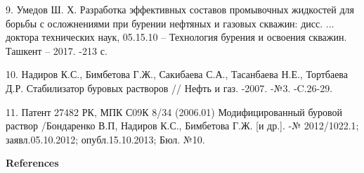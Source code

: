 \begin{references}
9. Умедов Ш. Х. Разработка эффективных составов промывочных жидкостей
для борьбы с осложнениями при бурении нефтяных и газовых скважин: дисс.
... доктора технических наук, 05.15.10 -- Технология бурения и освоения
скважин. Ташкент -- 2017. -213 с.

10. Надиров К.С., Бимбетова Г.Ж., Сакибаева С.А., Тасанбаева Н.Е.,
Тортбаева Д.Р. Стабилизатор буровых растворов // Нефть и газ. -2007.
-№3. -C.26-29.

11. Патент 27482 РК, МПК С09К 8/34 (2006.01) Модифицированный буровой
раствор /Бондаренко В.П, Надиров К.С., Бимбетова Г.Ж. {[}и др.{]}. -№
2012/1022.1; заявл.05.10.2012; опубл.15.10.2013; Бюл. №10.
\end{references}

\begin{center}
{\bfseries References}
\end{center}


